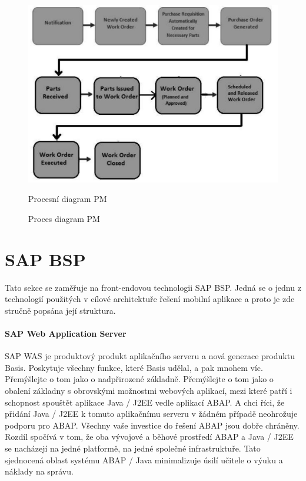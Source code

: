 \documentclass[thesis=M,czech]{FITthesis}[2012/06/26]
\begin{document}
\begin{figure}[H]
	\centering
	\includegraphics[width=1\textwidth]{images/pm_process.jpg}
	\caption{Proces diagram PM}
	\label{img:pm_process}
	\small
	Procesní diagram PM
\end{figure}

\section{SAP BSP}
Tato sekce se zaměřuje na front-endovou technologii SAP BSP. Jedná se o jednu z technologií použitých v cílové architektuře řešení mobilní aplikace a proto je zde stručně popsána její struktura.

\paragraph{SAP Web Application Server} SAP WAS je produktový produkt aplikačního serveru a nová generace produktu Basis. Poskytuje všechny funkce, které Basis udělal, a pak mnohem víc. Přemýšlejte o tom jako o nadpřirozené základně. Přemýšlejte o tom jako o obalení základny s obrovskými možnostmi webových aplikací, mezi které patří i schopnost spouštět aplikace Java / J2EE vedle aplikací ABAP. A chci říci, že přidání Java / J2EE k tomuto aplikačnímu serveru v žádném případě neohrožuje podporu pro ABAP. Všechny vaše investice do řešení ABAP jsou dobře chráněny. Rozdíl spočívá v tom, že oba vývojové a běhové prostředí ABAP a Java / J2EE se nacházejí na jedné platformě, na jedné společné infrastruktuře. Tato sjednocená oblast systému ABAP / Java minimalizuje úsilí učitele o výuku a náklady na správu.
\end{document}
